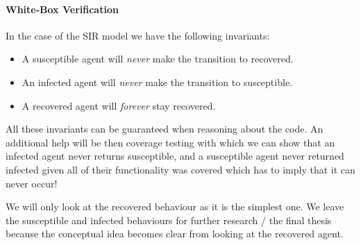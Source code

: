 \paragraph{White-Box Verification}

In the case of the SIR model we have the following invariants: 
\begin{itemize}
	\item A susceptible agent will \textit{never} make the transition to recovered.
	\item An infected agent will \textit{never} make the transition to susceptible.
	\item A recovered agent will \textit{forever} stay recovered.
\end{itemize}

All these invariants can be guaranteed when reasoning about the code. An additional help will be then coverage testing with which we can show that an infected agent never returns susceptible, and a susceptible agent never returned infected given all of their functionality was covered which has to imply that it can never occur!


We will only look at the recovered behaviour as it is the simplest one. We leave the susceptible and infected behaviours for further research / the final thesis because the conceptual idea becomes clear from looking at the recovered agent.

